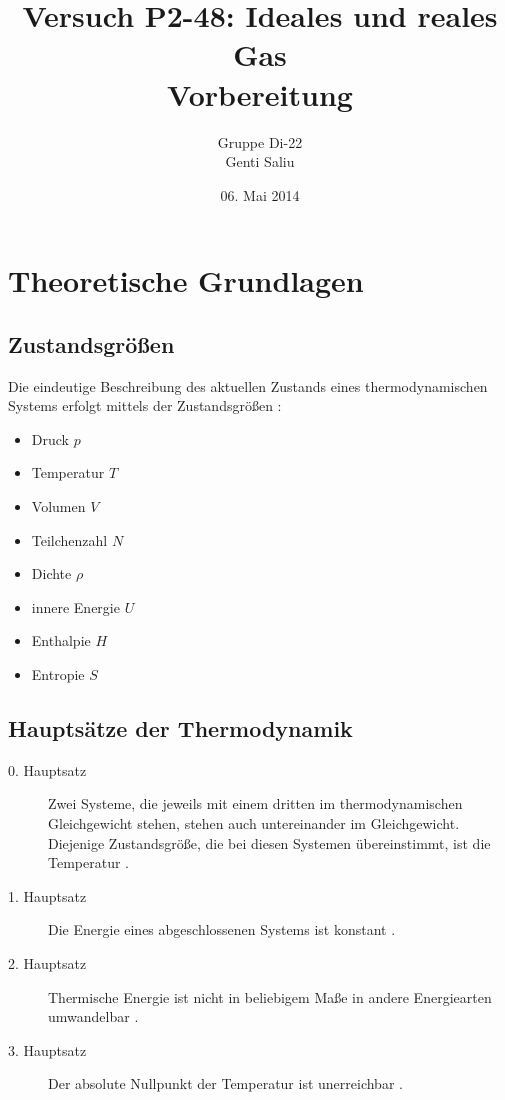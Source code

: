 \documentclass[a4paper,titlepage]{scrartcl}
\title{Versuch P2-48: Ideales und reales Gas\\Vorbereitung}
\author{Gruppe Di-22\\Genti Saliu}
\date{06. Mai 2014}
\numberwithin{equation}{section}
\begin{document}
	\begin{titlepage}
		\maketitle
		\thispagestyle{empty}
	\end{titlepage}
	
\newpage
{}
\tableofcontents

\newpage
{}

\section{Theoretische Grundlagen}

\subsection{Zustandsgrößen}
Die eindeutige Beschreibung des aktuellen Zustands eines thermodynamischen Systems erfolgt mittels der Zustandsgrößen \cite{wiki:zustandsGroesse}:
\begin{itemize}
	\item Druck $p$
	\item Temperatur $T$
	\item Volumen $V$
	\item Teilchenzahl $N$
	\item Dichte $\rho$
	\item innere Energie $U$
	\item Enthalpie $H$
	\item Entropie $S$
\end{itemize}

\subsection{Hauptsätze der Thermodynamik}
\begin{description}
\item[0. Hauptsatz] Zwei Systeme, die jeweils mit einem dritten im thermodynamischen Gleichgewicht stehen, stehen auch untereinander im Gleichgewicht. Diejenige Zustandsgröße, die bei diesen Systemen übereinstimmt, ist die Temperatur \cite{wiki:thermodynamik}.
\item[1. Hauptsatz] Die Energie eines abgeschlossenen Systems ist konstant \cite{wiki:thermodynamik}.
\item[2. Hauptsatz] Thermische Energie ist nicht in beliebigem Maße in andere Energiearten umwandelbar \cite{wiki:thermodynamik}.
\item[3. Hauptsatz] Der absolute Nullpunkt der Temperatur ist unerreichbar \cite{wiki:thermodynamik}.
\end{description}
\end{document}
